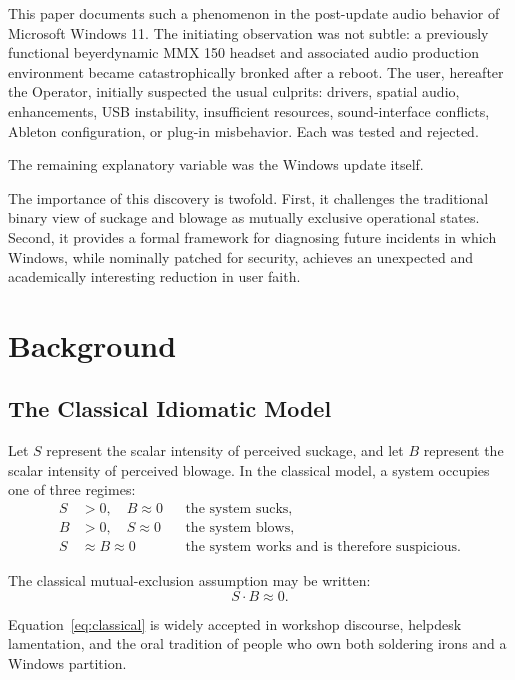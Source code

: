 \documentclass[10pt,twocolumn]{article}
\begin{document}
This paper documents such a phenomenon in the post-update audio behavior of Microsoft Windows 11. The initiating observation was not subtle: a previously functional beyerdynamic MMX 150 headset and associated audio production environment became catastrophically bronked after a reboot. The user, hereafter the Operator, initially suspected the usual culprits: drivers, spatial audio, enhancements, USB instability, insufficient resources, sound-interface conflicts, Ableton configuration, or plug-in misbehavior. Each was tested and rejected.

The remaining explanatory variable was the Windows update itself.

The importance of this discovery is twofold. First, it challenges the traditional binary view of suckage and blowage as mutually exclusive operational states. Second, it provides a formal framework for diagnosing future incidents in which Windows, while nominally patched for security, achieves an unexpected and academically interesting reduction in user faith.

\section{Background}

\subsection{The Classical Idiomatic Model}

Let $S$ represent the scalar intensity of perceived suckage, and let $B$ represent the scalar intensity of perceived blowage. In the classical model, a system occupies one of three regimes:
\begin{align}
S &> 0,\quad B \approx 0 && \text{the system sucks,} \\
B &> 0,\quad S \approx 0 && \text{the system blows,} \\
S &\approx B \approx 0 && \text{the system works and is therefore suspicious.}
\end{align}

The classical mutual-exclusion assumption may be written:
\begin{equation}
S \cdot B \approx 0.
\label{eq:classical}
\end{equation}

Equation~\ref{eq:classical} is widely accepted in workshop discourse, helpdesk lamentation, and the oral tradition of people who own both soldering irons and a Windows partition.
\end{document}
